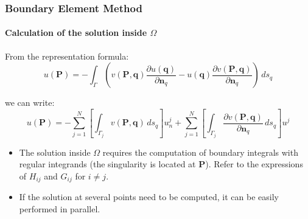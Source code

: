 \documentclass[10pt,xcolor=pdftex,dvipsnames,table]{beamer}
\begin{document}
\begin{frame}
	\frametitle{ Boundary Element Method }
	\framesubtitle{ Calculation of the solution inside $\Omega$ }
	
	From the representation formula:
	\begin{equation*}
		u(\boldsymbol{P}) = - \int_{\Gamma} \left( v(\boldsymbol{P},\boldsymbol{q}) \frac{\partial u(\boldsymbol{q})}{\partial \boldsymbol{n}_q} - u(\boldsymbol{q}) \frac{\partial v(\boldsymbol{P},\boldsymbol{q})}{\partial \boldsymbol{n}_q} \right)\, ds_q
	\end{equation*}	

	we can write:
	\begin{equation*}
	u(\boldsymbol{P}) = -\sum_{j=1}^{N} 
		\left[ \int_{\Gamma_j} v(\boldsymbol{P}, \boldsymbol{q}) \,ds_q   \right] 
	u_n^j
	+ \sum_{j=1}^{N} 
		\left[\int_{\Gamma_j} \frac{\partial v(\boldsymbol{P},\boldsymbol{q})}{\partial \boldsymbol{n}_q}\,ds_q\right] 
	u^j
\end{equation*}	

\begin{itemize}
	\item The solution inside $\Omega$ requires the computation of boundary integrals with regular integrands (the singularity is located at $\boldsymbol{P}$). Refer to the expressions of $H_{ij}$ and $G_{ij}$ for $i\neq j$. 
	\item If the solution at several points need to be computed, it can be easily performed in parallel.
\end{itemize}
	
	
\end{frame}
\end{document}
